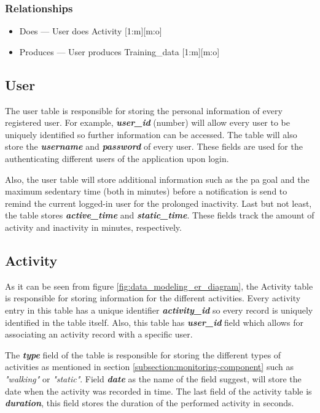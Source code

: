         \subsubsection{Relationships}
        \begin{itemize}
        \item Does --- User does Activity [1:m][m:o]
        \item Produces --- User produces Training\_data [1:m][m:o]
        \end{itemize}
        
        \subsection{User}
        The user table is responsible for storing the personal information of every registered user. For example, \textbf{\textit{user\_id}} (number) will allow every user to be uniquely identified so further information can be accessed. The table will also store the \textbf{\textit{username}} and \textbf{\textit{password}} of every user. These fields are used for the authenticating different users of the application upon login.
        
        Also, the user table will store additional information such as the \gls{pa} goal and the maximum sedentary time (both in minutes) before a notification is send to remind the current logged-in user for the prolonged inactivity. Last but not least, the table stores \textbf{\textit{active\_time}} and \textbf{\textit{static\_time}}. These fields track the amount of activity and inactivity in minutes, respectively.  
        
        \subsection{Activity}
        As it can be seen from figure \ref{fig:data_modeling_er_diagram}, the Activity table is responsible for storing information for the different activities. Every activity entry in this table has a unique identifier \textbf{\textit{activity\_id}} so every record is uniquely identified in the table itself. Also, this table has \textbf{\textit{user\_id}} field which allows for associating an activity record with a specific user.
        
        The \textbf{\textit{type}} field of the table is responsible for storing the different types of activities as mentioned in section \ref{subsection:monitoring-component} such as \textit{"walking"} or \textit{"static"}. Field \textbf{\textit{date}} as the name of the field suggest, will store the date when the activity was recorded in time. The last field of the activity table is \textbf{\textit{duration}}, this field stores the duration of the performed activity in seconds.
        
